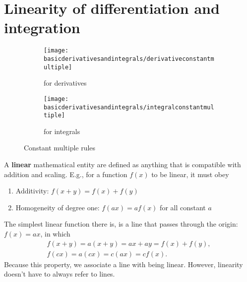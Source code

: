 \section{Linearity of differentiation and integration}
\label{sec:diff_int_linearity}

\begin{figure}[h]
    \centering
    \begin{subfigure}[t]{0.75\textwidth}
        \centering
        \texttt{[image: basicderivativesandintegrals/derivativeconstantmultiple]}
        \caption{for derivatives}
        \label{fig:derivativesconstantmultiple}
    \end{subfigure}
    \begin{subfigure}[b]{0.36\textwidth}
        \centering
        \texttt{[image: basicderivativesandintegrals/integralconstantmultiple]}
        \caption{for integrals}
        \label{fig:integralsconstantmultiple}
    \end{subfigure}
    \caption{Constant multiple rules}
\end{figure}

A \textbf{linear} mathematical entity are defined as anything that is compatible with addition and scaling. E.g., for a function $f(x)$ to be linear, it must obey
\begin{enumerate}[noitemsep]
    \item Additivity: $f(x + y) = f(x) + f(y)$
    \item Homogeneity of degree one: $f(ax) = af(x)$ for all constant $a$
\end{enumerate}
The simplest linear function there is, is a line that passes through the origin: $f(x) = ax$, in which
\begin{gather}
    f(x + y) = a(x + y) = ax + ay = f(x) + f(y), \\
    f(cx) = a(cx) = c(ax) = cf(x).
\end{gather}
Because this property, we associate a line with being linear. However, linearity doesn't have to always refer to lines.

